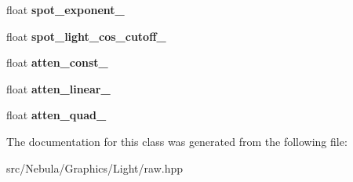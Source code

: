\begin{DoxyCompactItemize}
\item 
\hypertarget{classNeb_1_1Light_1_1Raw_a285f6d9190387145516723b7e948e202}{float {\bfseries spot\-\_\-exponent\-\_\-}}\label{classNeb_1_1Light_1_1Raw_a285f6d9190387145516723b7e948e202}

\item 
\hypertarget{classNeb_1_1Light_1_1Raw_a986fd41340b344278391c66a6035ef25}{float {\bfseries spot\-\_\-light\-\_\-cos\-\_\-cutoff\-\_\-}}\label{classNeb_1_1Light_1_1Raw_a986fd41340b344278391c66a6035ef25}

\item 
\hypertarget{classNeb_1_1Light_1_1Raw_a250cbd436693ec76682e155c67cd3134}{float {\bfseries atten\-\_\-const\-\_\-}}\label{classNeb_1_1Light_1_1Raw_a250cbd436693ec76682e155c67cd3134}

\item 
\hypertarget{classNeb_1_1Light_1_1Raw_a5d04260278c55416148811525226ecb1}{float {\bfseries atten\-\_\-linear\-\_\-}}\label{classNeb_1_1Light_1_1Raw_a5d04260278c55416148811525226ecb1}

\item 
\hypertarget{classNeb_1_1Light_1_1Raw_a933d4fc34b895ec2748b60147346ce7b}{float {\bfseries atten\-\_\-quad\-\_\-}}\label{classNeb_1_1Light_1_1Raw_a933d4fc34b895ec2748b60147346ce7b}

\end{DoxyCompactItemize}


\-The documentation for this class was generated from the following file\-:\begin{DoxyCompactItemize}
\item 
src/\-Nebula/\-Graphics/\-Light/raw.\-hpp\end{DoxyCompactItemize}

